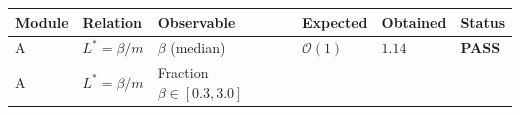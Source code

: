 \documentclass[
  11pt,
]{article}
\begin{document}
\begin{longtable}[]{@{}llllll@{}}
\toprule
\begin{minipage}[b]{0.14\columnwidth}\raggedright
Module\strut
\end{minipage} & \begin{minipage}[b]{0.14\columnwidth}\raggedright
Relation\strut
\end{minipage} & \begin{minipage}[b]{0.14\columnwidth}\raggedright
Observable\strut
\end{minipage} & \begin{minipage}[b]{0.14\columnwidth}\raggedright
Expected\strut
\end{minipage} & \begin{minipage}[b]{0.14\columnwidth}\raggedright
Obtained\strut
\end{minipage} & \begin{minipage}[b]{0.14\columnwidth}\raggedright
Status\strut
\end{minipage}\tabularnewline
\midrule
\endhead
\begin{minipage}[t]{0.14\columnwidth}\raggedright
A\strut
\end{minipage} & \begin{minipage}[t]{0.14\columnwidth}\raggedright
\(L^* = \beta/m\)\strut
\end{minipage} & \begin{minipage}[t]{0.14\columnwidth}\raggedright
\(\beta\) (median)\strut
\end{minipage} & \begin{minipage}[t]{0.14\columnwidth}\raggedright
\(\mathcal{O}(1)\)\strut
\end{minipage} & \begin{minipage}[t]{0.14\columnwidth}\raggedright
\(1.14\)\strut
\end{minipage} & \begin{minipage}[t]{0.14\columnwidth}\raggedright
\textbf{PASS}\strut
\end{minipage}\tabularnewline
\begin{minipage}[t]{0.14\columnwidth}\raggedright
A\strut
\end{minipage} & \begin{minipage}[t]{0.14\columnwidth}\raggedright
\(L^* = \beta/m\)\strut
\end{minipage} & \begin{minipage}[t]{0.14\columnwidth}\raggedright
Fraction \(\beta \in [0.3, 3.0]\)\strut
\end{minipage} & \begin{minipage}[t]{0.14\columnwidth}\raggedright

\end{minipage}
\end{longtable}
\end{document}

